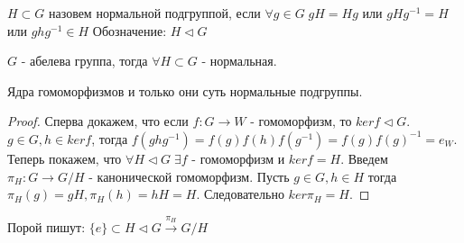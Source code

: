 \begin{defn}
  $H \subset G$ назовем нормальной подгруппой, если $ \forall g \in G \; gH = Hg $ или $ gHg^{-1} = H $ или $ ghg^{-1} \in H $  
  \newline Обозначение: $H \triangleleft G$
\end{defn}

\begin{thm}
  $ G $ - абелева группа, тогда $ \forall H \subset G $ - нормальная.
\end{thm}

\pagebreak

\begin{thm}
  Ядра гомоморфизмов и только они суть нормальные подгруппы.
\end{thm}
\begin{proof}
  Сперва докажем, что если $ f: G \rightarrow W $ - гомоморфизм, то $ ker f \triangleleft G $. 
  $ g \in G, h \in ker f $, тогда $ f(ghg^{-1}) = f(g)f(h)f(g^{-1}) = f(g)f(g)^{-1} = e_W $. \newline
  Теперь покажем, что $ \forall H \triangleleft G \; \exists f $ - гомоморфизм и $ ker f = H $.
  Введем $ \pi_{H} : G \rightarrow G/H $ - канонической гомоморфизм. Пусть $ g \in G, h \in H $ 
  тогда $\pi_{H}(g) = gH, \pi_{H}(h) = hH = H $. Следовательно $ ker \pi_{H} = H $.
\end{proof}

Порой пишут: $ \{e\} \subset H \triangleleft G \overset{\pi_{H}}{\rightarrow} G/H $ 





